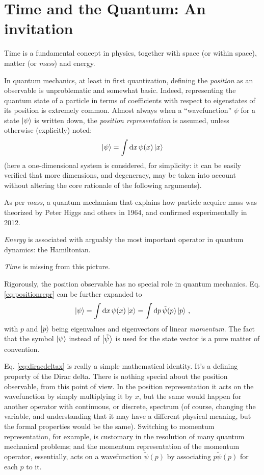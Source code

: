 \section{Time and the Quantum: An invitation}

Time is a fundamental concept in physics, together with space (or  within space),
matter (or \emph{mass}) and energy.

In quantum mechanics, at least in first quantization, defining the \emph{position} as
an observable is unproblematic and somewhat basic.
Indeed, representing the quantum state of a particle
in terms of coefficients with respect to eigenstates of its position is extremely common.
Almost always when a ``wavefunction'' $\psi$
for a state $\ket{\psi}$
is written down, the \emph{position representation}
is assumed, unless otherwise (explicitly) noted:
\begin{equation}\label{eq:positionrepr}
  \ket{\psi} = \int \dd{x} \psi(x) \ket{x}
\end{equation}
(here a one-dimensional system is considered, for simplicity:
it can be easily verified that more dimensions,
and degeneracy, may be taken into account without altering the core rationale of the
following arguments).

As per \emph{mass}, a quantum mechanism that explains how particle acquire mass was theorized by
Peter Higgs and others in 1964, and confirmed experimentally in 2012.

\emph{Energy} is associated with arguably the most important operator in quantum dynamics: the Hamiltonian.

\emph{Time} is missing from this picture.

Rigorously, the position observable has no special role in quantum mechanics.
Eq. \eqref{eq:positionrepr} can be further expanded to
\begin{equation}\label{eq:qprepr}
  \ket{\psi} = \int \dd{x} \psi(x) \ket{x} = \int \dd{p} \tilde{\psi}(p) \ket{p} \,\text{,}
\end{equation}
with $p$ and $\ket{p}$ being eigenvalues and eigenvectors of linear \emph{momentum}.
The fact that the symbol $\ket{\psi}$ instead of $\ket{\tilde{\psi}}$
is used for the state vector is a pure matter of convention.

Eq. \eqref{eq:diracdeltax} is really a simple mathematical identity.
It's a defining property of the Dirac delta.
There is nothing special about the position observable, from this point of view.
In the position representation it acts on the wavefunction by simply
multiplying it by $x$,
but the same would happen for another operator with continuous, or discrete, spectrum
(of course, changing the variable, and understanding that it may have a different physical meaning,
but the formal properties would be the same).
Switching to momentum representation,
for example,
is customary in the resolution of many quantum mechanical problems;
and the momentum representation of the momentum operator,
essentially,
acts on a wavefunction $\tilde{\psi}(p)$ by associating
$p\tilde{\psi}(p)$ for each $p$ to it. 

